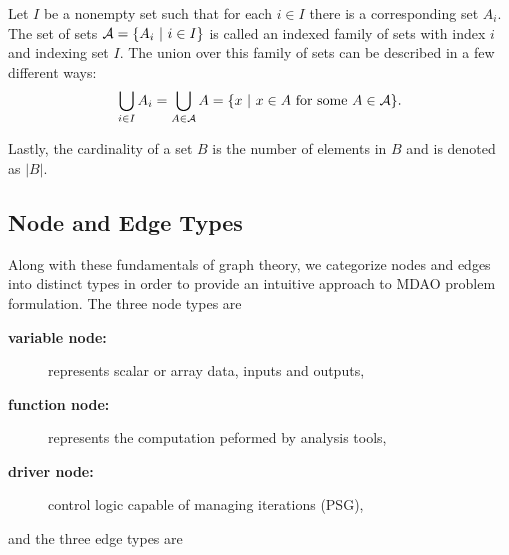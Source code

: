   Let $I$ be a nonempty set such that for each $i \in I$ there is a corresponding set $A_i$. 
  The set of sets $\mathcal A = \{A_i \ | \  i \in I\}$ is called an indexed family of sets with index $i$ and 
  indexing set $I$\cite{smith2006}. 
  The union over this family of sets can be described in a few different ways:
  \begin{equation}
  \bigcup_{i \in I} A_i = \bigcup_{A \in \mathcal A} A = \{x \ | \  x \in A \textrm{ for some } A \in \mathcal A\}.
  \end{equation}

  Lastly, the cardinality of a set $B$ is the number of elements in $B$ and is denoted as $|B|$.

\subsection{Node and Edge Types}
  \label{ss:types}
  Along with these fundamentals of graph theory, we categorize nodes and edges 
  into distinct types in order to provide an intuitive approach to MDAO problem formulation. The three node types are
    \begin{description}
      \item[\bf{variable node:}] represents scalar or array data, inputs and outputs,
      \item[\bf{function node:}] represents the computation peformed by analysis tools,
      \item[\bf{driver node:}] control logic capable of managing iterations (PSG),
    \end{description}
  and the three edge types are


